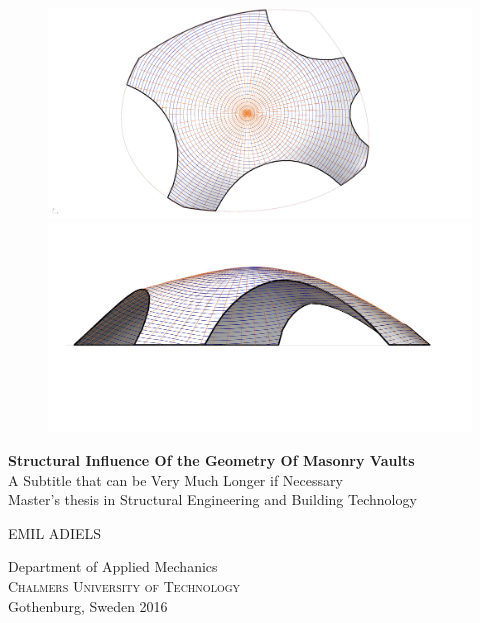 
\begin{titlepage}
			
\addtolength{\voffset}{2cm}

\begin{figure}[H]
\centering
\vspace{1cm}	%
\includegraphics[width=0.7\linewidth]{figure/Results/geotop2.jpg}
\includegraphics[width=0.7\linewidth]{figure/Results/geofront2.jpg}
\end{figure}

\mbox{}
\vfill
\renewcommand{\familydefault}{\sfdefault} \normalfont %
\textbf{{\Huge 	Structural Influence Of the Geometry Of Masonry Vaults }} 	\\[0.5cm]
{\Large A Subtitle that can be Very Much Longer if Necessary}\\[0.5cm]
Master's thesis in Structural Engineering and Building Technology \setlength{\parskip}{1cm}

{\Large EMIL ADIELS} \setlength{\parskip}{2.9cm}

Department of Applied Mechanics \\
\textsc{Chalmers University of Technology} \\
Gothenburg, Sweden 2016

\renewcommand{\familydefault}{\rmdefault} \normalfont %
\end{titlepage}


